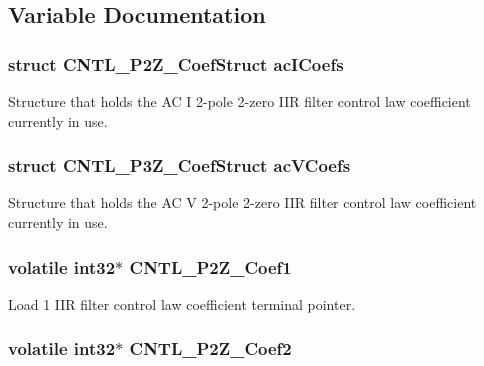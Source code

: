 \subsection{Variable Documentation}
\hypertarget{a00014_a05ea1ba581ea8bf1eb5c44f15534d31c}{
\subsubsection[{ac\-I\-Coefs}]{\setlength{\rightskip}{0pt plus 5cm}struct C\-N\-T\-L\-\_\-P2\-Z\-\_\-\-Coef\-Struct ac\-I\-Coefs}}\label{a00014_a05ea1ba581ea8bf1eb5c44f15534d31c}
Structure that holds the A\-C I 2-\/pole 2-\/zero I\-I\-R filter control law coefficient currently in use. \hypertarget{a00014_a1b7cdba3e3e2fb71309dd78c6c1cd4cc}{
\subsubsection[{ac\-V\-Coefs}]{\setlength{\rightskip}{0pt plus 5cm}struct C\-N\-T\-L\-\_\-P3\-Z\-\_\-\-Coef\-Struct ac\-V\-Coefs}}\label{a00014_a1b7cdba3e3e2fb71309dd78c6c1cd4cc}
Structure that holds the A\-C V 2-\/pole 2-\/zero I\-I\-R filter control law coefficient currently in use. \hypertarget{a00014_a047c759a71b80d8cfd5e6f52b1b021b9}{
\subsubsection[{C\-N\-T\-L\-\_\-2\-P2\-Z\-\_\-\-Coef1}]{\setlength{\rightskip}{0pt plus 5cm}volatile int32$\ast$ C\-N\-T\-L\-\_\-P2\-Z\-\_\-\-Coef1}}\label{a00014_a047c759a71b80d8cfd5e6f52b1b021b9}
Load 1 I\-I\-R filter control law coefficient terminal pointer. \hypertarget{a00014_abdc599cbabc62898c49926678c3327e6}{
\subsubsection[{C\-N\-T\-L\-\_\-2\-P2\-Z\-\_\-\-Coef2}]{\setlength{\rightskip}{0pt plus 5cm}volatile int32$\ast$ C\-N\-T\-L\-\_\-P2\-Z\-\_\-\-Coef2}}\label{a00014_abdc599cbabc62898c49926678c3327e6}
